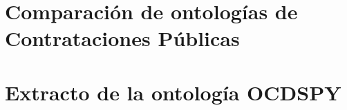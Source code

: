 \begin{appendices}
\chapter{Comparación de ontologías de Contrataciones Públicas}
\label{chap:comparaciondeOntologias}


\chapter{Extracto de la ontología OCDSPY}


\end{appendices}